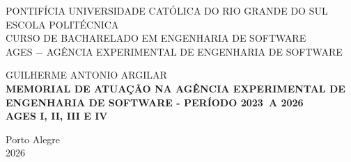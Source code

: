 \author{Guilherme Antonio Argilar}

\def\autor{\uppercase{Guilherme Antonio Argilar}}
\def\inicio{2023}
\def\fim{2026}
\def\ages{I, II, III e IV}
\def\local{Porto Alegre}
\def\ano{2026}

\begin{capa}
  \centering
    \uppercase{
      PONTIFÍCIA UNIVERSIDADE CATÓLICA DO RIO GRANDE DO SUL\\
      ESCOLA POLITÉCNICA\\
      CURSO DE BACHARELADO EM ENGENHARIA DE SOFTWARE\\
      AGES $-$ AGÊNCIA EXPERIMENTAL DE ENGENHARIA DE SOFTWARE\\
      }

    \vfill
    \autor\\
    \vfill
    \textbf{
      \uppercase{
        Memorial de atuação na Agência Experimental de Engenharia de Software
        {-} Período \inicio\ a \fim\
        \\AGES \ages\
      }
    }

    \vfill

    \vfill
    \local\\
    \ano\
  \end{capa}